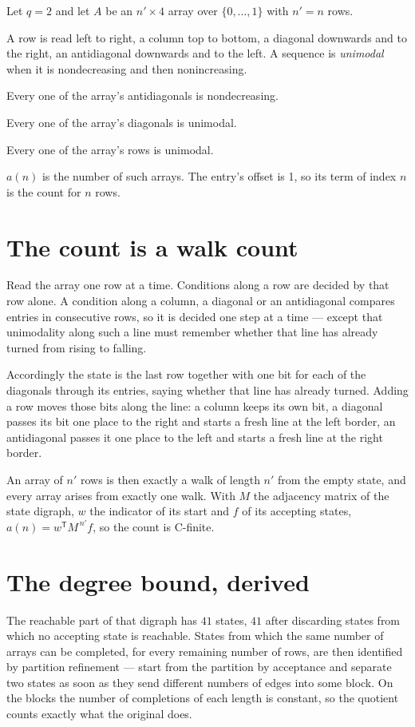 \documentclass[11pt]{article}
\theoremstyle{definition}
\begin{document}
Let $q = 2$ and let $A$ be an $n' \times 4$ array over $\{0,\dots,1\}$ with $n' = n$ rows.

A row is read left to right, a column top to bottom, a diagonal downwards and to the right, an antidiagonal downwards and to the left. A sequence is {\itshape unimodal} when it is nondecreasing and then nonincreasing.

Every one of the array's antidiagonals is nondecreasing.

Every one of the array's diagonals is unimodal.

Every one of the array's rows is unimodal.

$a(n)$ is the number of such arrays. The entry's offset is 1, so its term of index $n$ is the count for $n$ rows.

\section{The count is a walk count}

Read the array one row at a time. Conditions along a row are decided by that row alone. A condition along a column, a diagonal or an antidiagonal compares entries in consecutive rows, so it is decided one step at a time --- except that unimodality along such a line must remember whether that line has already turned from rising to falling.

Accordingly the state is the last row together with one bit for each of the diagonals through its entries, saying whether that line has already turned. Adding a row moves those bits along the line: a column keeps its own bit, a diagonal passes its bit one place to the right and starts a fresh line at the left border, an antidiagonal passes it one place to the left and starts a fresh line at the right border.

An array of $n'$ rows is then exactly a walk of length $n'$ from the empty state, and every array arises from exactly one walk. With $M$ the adjacency matrix of the state digraph, $w$ the indicator of its start and $f$ of its accepting states, $a(n) = w^{\mathsf T}M^{\,n'}f$, so the count is C-finite.

\section{The degree bound, derived}

The reachable part of that digraph has $41$ states, $41$ after discarding states from which no accepting state is reachable. States from which the same number of arrays can be completed, for every remaining number of rows, are then identified by partition refinement --- start from the partition by acceptance and separate two states as soon as they send different numbers of edges into some block. On the blocks the number of completions of each length is constant, so the quotient counts exactly what the original does.
\end{document}
